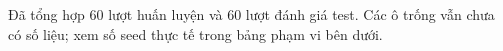 Đã tổng hợp 60 lượt huấn luyện và 60 lượt đánh giá test. Các ô trống vẫn chưa có số liệu; xem số seed thực tế trong bảng phạm vi bên dưới.
